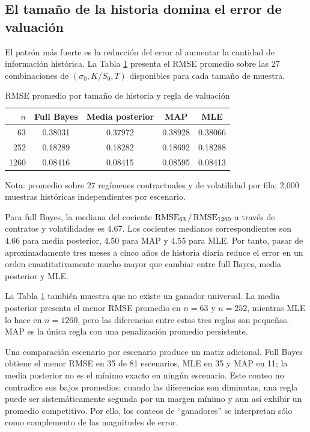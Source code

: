 \subsection{El tamaño de la historia domina el error de valuación}

El patrón más fuerte es la reducción del error al aumentar la cantidad de información histórica. La Tabla \ref{tab:rmse_n} presenta el RMSE promedio sobre las 27 combinaciones de $(\sigma_0,K/S_0,T)$ disponibles para cada tamaño de muestra.

\begin{table}[H]
\centering
\caption{RMSE promedio por tamaño de historia y regla de valuación}
\label{tab:rmse_n}
\begin{tabular}{rcccc}
\toprule
$n$ & Full Bayes & Media posterior & MAP & MLE \\
\midrule
63   & 0.38031 & 0.37972 & 0.38928 & 0.38066 \\
252  & 0.18289 & 0.18282 & 0.18692 & 0.18288 \\
1260 & 0.08416 & 0.08415 & 0.08595 & 0.08413 \\
\bottomrule
\end{tabular}

\vspace{0.15cm}
\footnotesize Nota: promedio sobre 27 regímenes contractuales y de volatilidad por fila; 2,000 muestras históricas independientes por escenario.
\end{table}

Para full Bayes, la mediana del cociente $\operatorname{RMSE}_{63}/\operatorname{RMSE}_{1260}$ a través de contratos y volatilidades es 4.67. Los cocientes medianos correspondientes son 4.66 para media posterior, 4.50 para MAP y 4.55 para MLE. Por tanto, pasar de aproximadamente tres meses a cinco años de historia diaria reduce el error en un orden cuantitativamente mucho mayor que cambiar entre full Bayes, media posterior y MLE.

La Tabla \ref{tab:rmse_n} también muestra que no existe un ganador universal. La media posterior presenta el menor RMSE promedio en $n=63$ y $n=252$, mientras MLE lo hace en $n=1260$, pero las diferencias entre estas tres reglas son pequeñas. MAP es la única regla con una penalización promedio persistente.

Una comparación escenario por escenario produce un matiz adicional. Full Bayes obtiene el menor RMSE en 35 de 81 escenarios, MLE en 35 y MAP en 11; la media posterior no es el mínimo exacto en ningún escenario. Este conteo no contradice sus bajos promedios: cuando las diferencias son diminutas, una regla puede ser sistemáticamente segunda por un margen mínimo y aun así exhibir un promedio competitivo. Por ello, los conteos de ``ganadores'' se interpretan sólo como complemento de las magnitudes de error.

